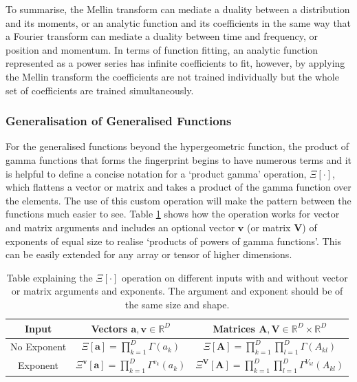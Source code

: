 \documentclass{article}
\begin{document}
To summarise, the Mellin transform can mediate a duality between a distribution and its moments, or an analytic function and its coefficients in the same way that a Fourier transform can mediate a duality between time and frequency, or position and momentum. In terms of function fitting, an analytic function represented as a power series has infinite coefficients to fit, however, by applying the Mellin transform the coefficients are not trained individually but the whole set of coefficients are trained simultaneously. 


\subsubsection{Generalisation of Generalised Functions}
For the generalised functions beyond the hypergeometric function, the product of gamma functions that forms the fingerprint begins to have numerous terms and it is helpful to define a concise notation for a `product gamma' operation, $\Xi[\cdot]$, which flattens a vector or matrix and takes a product of the gamma function over the elements. The use of this custom operation will make the pattern between the functions much easier to see. Table \ref{tab:Xi} shows how the operation works for vector and matrix arguments and includes an optional vector $\mathbf{v}$ (or matrix $\mathbf{V}$) of exponents of equal size to realise `products of powers of gamma functions'. This can be easily extended for any array or tensor of higher dimensions.
\begin{table}[h]
\caption{Table explaining the $\Xi[\cdot]$ operation on different inputs with and without vector or matrix arguments and exponents. The argument and exponent should be of the same size and shape.}
\centering
\begin{tabular}{|c|c|c|}
\hline
Input & Vectors $\mathbf{a,v} \in \mathbb{R}^D$ & Matrices $\mathbf{A,V} \in \mathbb{R}^D\times \mathbb{R}^D$ \\
\hline
No Exponent & $\Xi[\mathbf{a}] = \prod_{k=1}^D \Gamma(a_k)$ & $\Xi[\mathbf{A}] = \prod_{k=1}^D\prod_{l=1}^D \Gamma(A_{kl})$ \\
Exponent & $\Xi^\mathbf{v}[\mathbf{a}] = \prod_{k=1}^D \Gamma^{v_k}(a_k)$ & $\Xi^\mathbf{V}[\mathbf{A}] = \prod_{k=1}^D\prod_{l=1}^D \Gamma^{V_{kl}}(A_{kl})$\\
\hline
\end{tabular}
\label{tab:Xi}
\end{table}
\end{document}
